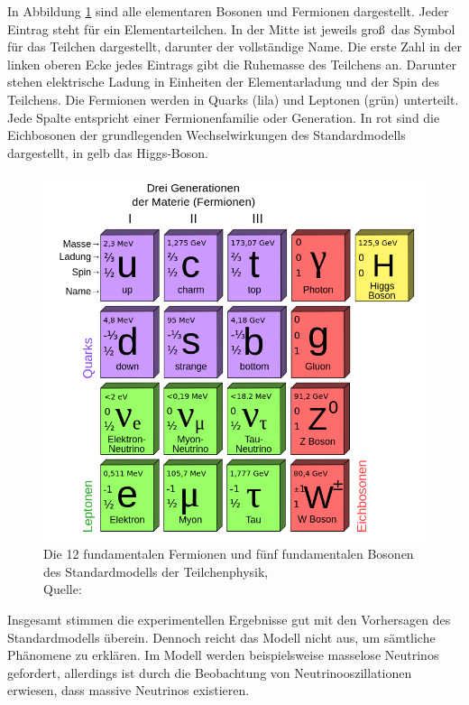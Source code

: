 In Abbildung \ref{fig:Standardmodell} sind alle elementaren Bosonen und Fermionen dargestellt. Jeder Eintrag steht f\"ur ein Elementarteilchen. In der Mitte ist jeweils gro\ss~das Symbol f\"ur das Teilchen dargestellt, darunter der vollst\"andige Name. Die erste Zahl in der linken oberen Ecke jedes Eintrags gibt die Ruhemasse des Teilchens an. Darunter stehen elektrische Ladung in Einheiten der Elementarladung und der Spin des Teilchens. Die Fermionen werden in Quarks (lila) und Leptonen (gr\"un) unterteilt. Jede Spalte entspricht einer Fermionenfamilie oder Generation. In rot sind die Eichbosonen der grundlegenden Wechselwirkungen des Standardmodells dargestellt, in gelb das Higgs-Boson.

\begin{figure}[tbp]
 \begin{center}
   \includegraphics[width=\textwidth]{graphics/Standard_Model.png}
   \parbox[b]{12cm}{
     \caption[Standardmodell der Teilchenphysik]
             {\label{fig:Standardmodell}Die 12 fundamentalen Fermionen und f\"unf fundamentalen Bosonen des Standardmodells der Teilchenphysik,\\ Quelle: \cite{wiki:Standardmodell}}
   }
 \end{center}
\end{figure}

Insgesamt stimmen die experimentellen Ergebnisse gut mit den Vorhersagen des Standardmodells \"uberein. Dennoch reicht das Modell nicht aus, um s\"amtliche Ph\"anomene zu erkl\"aren. Im Modell werden beispielsweise masselose Neutrinos gefordert, allerdings ist durch die Beobachtung von Neutrinooszillationen erwiesen, dass massive Neutrinos existieren.


